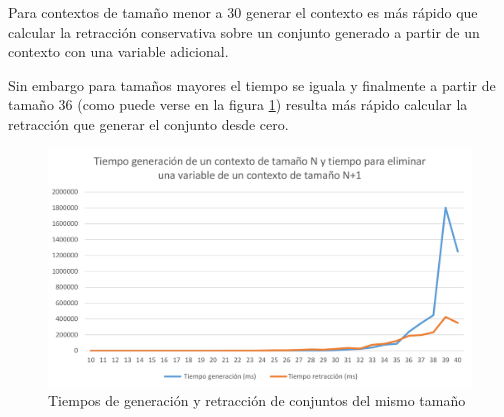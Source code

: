 	Para contextos de tamaño menor a 30 generar el contexto es más rápido que calcular la retracción conservativa sobre un conjunto generado a partir de un contexto con una variable adicional.
	
	Sin embargo para tamaños mayores el tiempo se iguala y finalmente a partir de tamaño 36 (como puede verse en la figura \ref{generacion}) resulta más rápido calcular la retracción que generar el conjunto desde cero.
	
	
	\begin{figure}[h]
		\centering
		\includegraphics[width=1\linewidth]{05_Pruebas/graficas/generacionLineas}
		\caption{Tiempos de generación y retracción de conjuntos del mismo tamaño}
		\label{generacion}
	\end{figure}

		